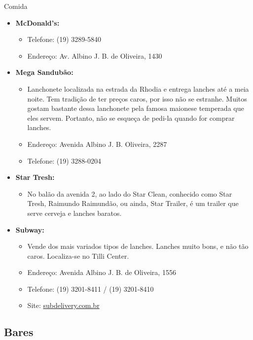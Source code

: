 \begin{story}{Comida}
\begin{itemize}
\item \textbf{McDonald's:}
\begin{itemize}
\item Telefone: (19) 3289-5840
\item Endereço: Av. Albino J. B. de Oliveira, 1430
\end{itemize}

\item \textbf{Mega Sandubão:}
\begin{itemize}
\item Lanchonete localizada na estrada da Rhodia e entrega lanches até a meia noite. Tem tradição de ter preços caros, por isso não se estranhe. Muitos gostam bastante dessa lanchonete pela famosa maionese temperada que eles servem. Portanto, não se esqueça de pedi-la quando for comprar lanches.
\item Endereço: Avenida Albino J. B. Oliveira, 2287
\item Telefone: (19) 3288-0204
\end{itemize}

\item \textbf{Star Tresh:}
\begin{itemize}
\item No balão da avenida 2, ao lado do Star Clean, conhecido como Star Tresh, Raimundo Raimundão, ou ainda, Star Trailer, é um trailer que serve cerveja e lanches baratos.
\end{itemize}

\item \textbf{Subway:}
\begin{itemize}
\item Vende dos mais variados tipos de lanches. Lanches muito bons, e não tão caros. Localiza-se no Tilli Center.
\item Endereço: Avenida Albino J. B. de Oliveira, 1556
\item Telefone: (19) 3201-8411 / (19) 3201-8410
\item Site: \url{subdelivery.com.br}
\end{itemize}

\end{itemize}

\subsection*{Bares}

\begin{itemize}


\end{itemize}
\end{story}
